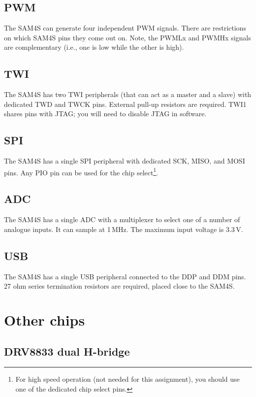 \subsection{PWM}\label{pwm}

The SAM4S can generate four independent PWM signals. There are
restrictions on which SAM4S pins they come out on. Note, the PWMLx and
PWMHx signals are complementary (i.e., one is low while the other is
high).

\subsection{TWI}\label{twi}

The SAM4S has two TWI peripherals (that can act as a master and
a slave) with dedicated TWD and TWCK pins. External pull-up resistors
are required.  TWI1 shares pins with JTAG; you will need to disable
JTAG in software.

\subsection{SPI}\label{spi}

The SAM4S has a single SPI peripheral with dedicated SCK, MISO, and
MOSI pins. Any PIO pin can be used for the chip select\footnote{For
  high speed operation (not needed for this assignment), you should
  use one of the dedicated chip select pins.}.

\subsection{ADC}\label{adc}

The SAM4S has a single ADC with a multiplexer to select one of a
number of analogue inputs.  It can sample at 1\,MHz.  The maximum
input voltage is 3.3\,V.

\subsection{USB}\label{usb}

The SAM4S has a single USB peripheral connected to the DDP and DDM
pins. 27 ohm series termination resistors are required, placed close to
the SAM4S.

\section{Other chips}\label{other-chips}

\subsection{DRV8833 dual H-bridge}\label{drv8833-dual-h-bridge}

